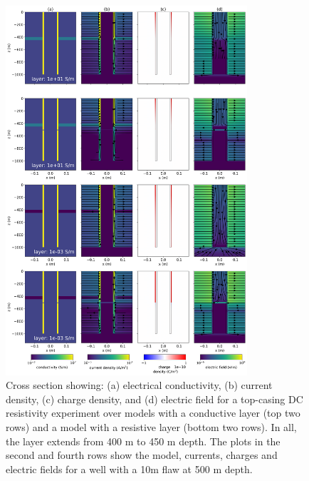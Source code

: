 \begin{figure}
    \begin{center}
    \includegraphics[width=0.8\textwidth]{figures/integrity_layer_physics.png}
    \end{center}
\caption{
    Cross section showing: (a) electrical conductivity, (b) current density, (c) charge density,
    and (d) electric field for a top-casing DC resistivity experiment over models with a conductive layer
    (top two rows) and a model with a resistive layer (bottom two rows). In all, the layer extends from
    400 m to 450 m depth. The plots in the second and fourth rows show the model, currents, charges and electric
    fields for a well with a 10m flaw at 500 m depth.
}
\label{fig:integrity_layer_physics}
\end{figure}
